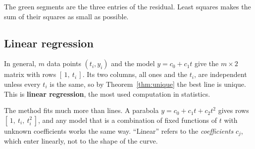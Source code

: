 \documentclass[11pt]{article}
\theoremstyle{plain}
\theoremstyle{definition}
\theoremstyle{remark}
\begin{document}
\begin{center}
\end{center}

\noindent The green segments are the three entries of the residual. Least
squares makes the sum of their squares as small as possible.

\subsection{Linear regression}
In general, $m$ data points $(t_i,y_i)$ and the model $y=c_0+c_1t$ give the
$m\times2$ matrix with rows $[\,1,\ t_i\,]$. Its two columns, all ones and the
$t_i$, are independent unless every $t_i$ is the same, so by
Theorem~\ref{thm:unique} the best line is unique. This is \textbf{linear
regression}, the most used computation in statistics.

The method fits much more than lines. A parabola $y=c_0+c_1t+c_2t^{2}$ gives rows
$[\,1,\ t_i,\ t_i^{2}\,]$, and any model that is a combination of fixed functions
of $t$ with unknown coefficients works the same way. ``Linear'' refers to the
\emph{coefficients} $c_j$, which enter linearly, not to the shape of the curve.

\end{document}

